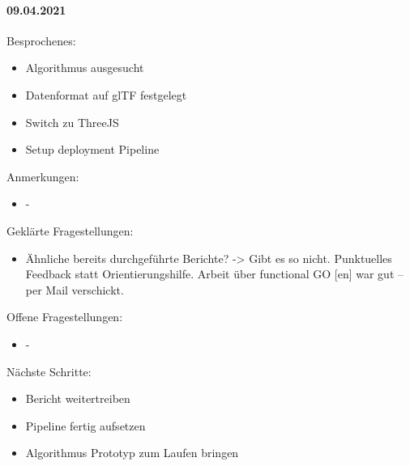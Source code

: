 \paragraph{09.04.2021}
Besprochenes:
\begin{itemize}
  \item Algorithmus ausgesucht
  \item Datenformat auf glTF festgelegt
  \item Switch zu ThreeJS
  \item Setup deployment Pipeline
\end{itemize}
Anmerkungen:
\begin{itemize}
  \item -
\end{itemize}
Geklärte Fragestellungen:
\begin{itemize}
  \item Ähnliche bereits durchgeführte Berichte? -> Gibt es so nicht. Punktuelles Feedback statt Orientierungshilfe. Arbeit über functional GO [en] war gut – per Mail verschickt.
\end{itemize}
Offene Fragestellungen:
\begin{itemize}
  \item -
\end{itemize}
Nächste Schritte:
\begin{itemize}
  \item Bericht weitertreiben
  \item Pipeline fertig aufsetzen
  \item Algorithmus Prototyp zum Laufen bringen
\end{itemize}

\newpage

